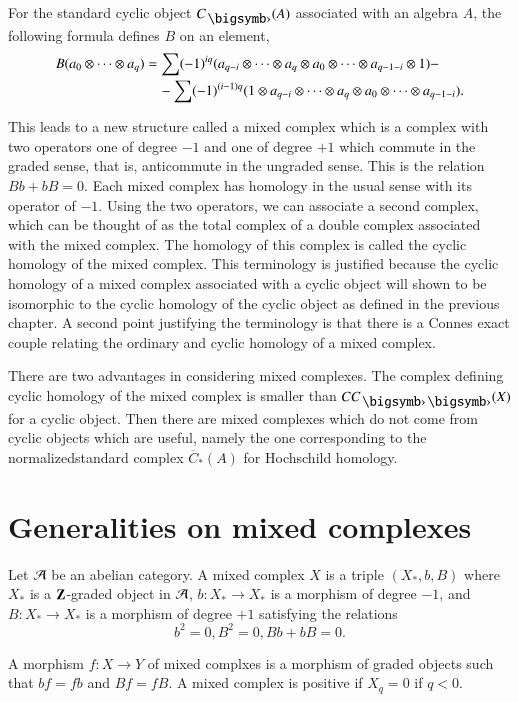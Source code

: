 \begin{remark}\label{chap5-rem1.3}
For the standard cyclic object $C_{\bigdot}(A)$ associated with an
algebra $A$, the following formula defines $B$ on an element,
{\fontsize{10}{12}\selectfont
\begin{align*}
B(a_{0}\otimes\cdots\otimes a_{q}) &=
\sum(-1)^{iq}(a_{q-i}\otimes\cdots\otimes a_{q}\otimes
a_{0}\otimes\cdots\otimes a_{q-1-i}\otimes 1)- \\
&\quad-\sum(-1)^{(i-1)q}(1\otimes a_{q-i}\otimes\cdots\otimes
a_{q}\otimes a_{0}\otimes\cdots\otimes a_{q-1-i}).
\end{align*}}
\end{remark}

This leads to a new structure called a mixed complex which is a
complex with two operators one of degree $-1$ and one of degree $+1$
which commute in the graded sense, that is, anticommute in the
ungraded sense. This is the relation $Bb+bB=0$. Each mixed complex has
homology in the usual sense with its operator of $-1$. Using the two
operators, we can associate a second complex, which can be thought of
as the total complex of a double complex associated with the mixed
complex. The homology of this complex is called the cyclic homology of
the mixed complex. This terminology is justified because the cyclic
homology of a mixed complex associated with a cyclic object will shown
to be isomorphic to the cyclic homology of the cyclic object as
defined in the previous chapter. A second point justifying the
terminology is that there is a Connes exact couple relating the
ordinary and cyclic homology of a mixed complex.

There are two advantages in considering mixed complexes. The complex
defining cyclic homology of the mixed complex is smaller than
$CC_{\bigdot\bigdot}(X)$ for a cyclic object. Then there are mixed
complexes which do not come from cyclic objects which are useful,
namely the one corresponding to the normalized\pageoriginale standard
complex $\overline{C}_{\ast}(A)$ for Hochschild homology.

\section{Generalities on mixed
  complexes}\label{chap5-sec2}

\begin{definition}\label{chap5-defi2.1}
Let $\mathcal{A}$ be an abelian category. A mixed complex $X$ is a triple
$(X_{\ast},b,B)$ where $X_{\ast}$ is a $\mathbf{Z}$-graded object in $\mathcal{A}$,
$b:X_{\ast}\to X_{\ast}$ is a morphism of degree $-1$, and
$B:X_{\ast}\to X_{\ast}$ is a morphism of degree $+1$ satisfying the
relations
$$
b^{2}=0, B^{2}=0, Bb+bB=0.
$$

A morphism $f:X\to Y$ of mixed complxes is a morphism of graded
objects such that $bf=fb$ and $Bf=fB$. A mixed complex is positive if
$X_{q}=0$ if $q<0$.
\end{definition}

